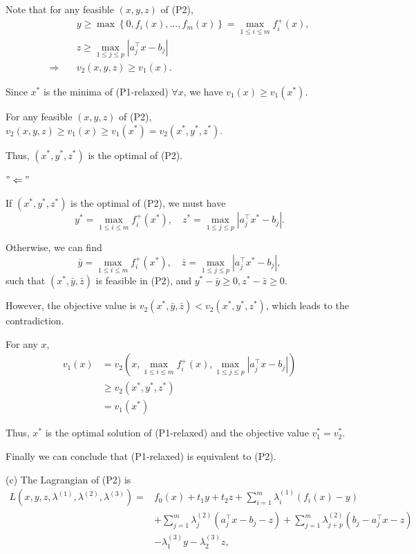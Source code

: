\documentclass[11pt]{article}
\begin{document}
Note that for any feasible $(x, y, z)$ of (P2),
$$
\begin{aligned}
& y \geq \max \left\{0, f_i(x), \dots, f_m(x)\right\}=\max _{1 \leq i \leq m} f_i^{+}(x), \\
& z \geq \max _{1 \leq j \leq p}\left|a_j^{\top} x-b_j\right|\\
\Rightarrow \quad & v_2(x, y, z) \geq v_1(x).
\end{aligned}
$$


Since $x^*$ is the minima of (P1-relaxed) $\forall x$, we have $v_1(x) \geq v_1\left(x^*\right)$.

For any feasible $(x, y, z)$ of (P2), $v_2(x, y, z) \geq v_1(x) \geq v_1\left(x^*\right)=v_2\left(x^*, y^*, z^*\right)$.

Thus, $\left(x^*, y^*, z^*\right)$ is the optimal of (P2).

$"\Leftarrow"$

If $\left(x^*, y^*, z^*\right)$ is the optimal of (P2), we must have
$$y^*=\max _{1 \leq i \leq m} f_i^{+}\left(x^*\right), \quad z^*=\max _{1 \leq j \leq p}\left|a_j^{\top} x^*-b_j\right|.$$

Otherwise, we can find
$$\bar{y}=\max _{1 \leq i \leq m} f_i^{+}\left(x^*\right),\quad \bar{z}=\max _{1 \leq j \leq p}\left|a_j^{\top} x^*-b_j\right|,$$ 
such that $\left(x^*, \bar{y}, \bar{z}\right)$ is feasible in
(P2), and $y^*-\bar{y} \geq 0, z^*-\bar{z} \geq 0$.

However, the objective value is $v_2\left(x^*, \bar{y}, \bar{z}\right)<v_2\left(x^*, y^*, z^*\right)$, which leads to the contradiction.

For any $x$,
$$
\begin{aligned}
v_1(x) 
& =v_2(x, \max _{1 \leq i \leq m} f_i^{+}(x), \max _{1 \leq j \leq p}\left|a_j^{\top} x-b_j\right|) \\
& \geq v_2\left(x^*, y^*, z^*\right)\\
& =v_1\left(x^*\right)
\end{aligned}
$$

Thus, $x^*$ is the optimal solution of (P1-relaxed) and the objective value $v_1^*=v_2^*$.

Finally we can conclude that (P1-relaxed) is equivalent to (P2).

(c)
The Lagrangian of (P2) is
\begin{align*}
  L\left(x, y, z, \lambda^{(1)}, \lambda^{(2)}, \lambda^{(3)}\right)= & f_0(x)+t_1 y+t_2 z+\sum_{i=1}^m \lambda_i^{(1)}\left(f_i(x)-y\right) \\
  & +\sum_{j=1}^m \lambda_j^{(2)}\left(a_j^{\top} x-b_j-z\right)+\sum_{j=1}^m \lambda_{j+p}^{(2)}\left(b_j-a_j^{\top} x-z\right) \\
  & -\lambda_{1}^{(3)} y - \lambda_{2}^{(3)} z,
\end{align*}
\end{document}
